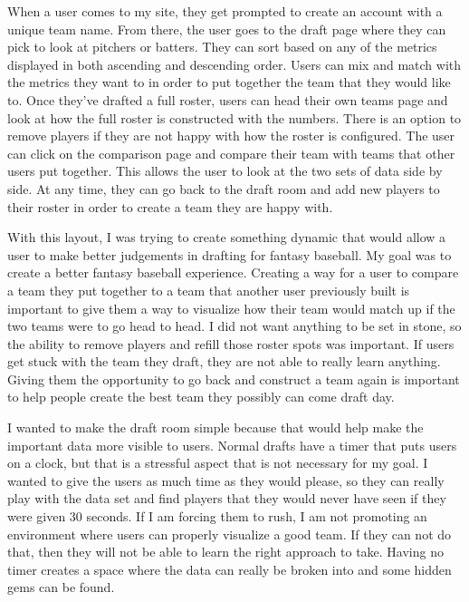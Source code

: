 \documentclass[10pt,twocolumn]{article}
\begin{document}
	When a user comes to my site, they get prompted to create an account with a unique team name. From there, the user goes to the draft page where they can pick to look at pitchers or batters. They can sort based on any of the metrics displayed in both ascending and descending order. Users can mix and match with the metrics they want to in order to put together the team that they would like to. Once they've drafted a full roster, users can head their own teams page and look at how the full roster is constructed with the numbers. There is an option to remove players if they are not happy with how the roster is configured. The user can click on the comparison page and compare their team with teams that other users put together. This allows the user to look at the two sets of data side by side. At any time, they can go back to the draft room and add new players to their roster in order to create a team they are happy with.
	
	With this layout, I was trying to create something dynamic that would allow a user to make better judgements in drafting for fantasy baseball. My goal was to create a better fantasy baseball experience. Creating a way for a user to compare a team they put together to a team that another user previously built is important to give them a way to visualize how their team would match up if the two teams were to go head to head. I did not want anything to be set in stone, so the ability to remove players and refill those roster spots was important. If users get stuck with the team they draft, they are not able to really learn anything. Giving them the opportunity to go back and construct a team again is important to help people create the best team they possibly can come draft day. 
	
	I wanted to make the draft room simple because that would help make the important data more visible to users. Normal drafts have a timer that puts users on a clock, but that is a stressful aspect that is not necessary for my goal. I wanted to give the users as much time as they would please, so they can really play with the data set and find players that they would never have seen if they were given 30 seconds. If I am forcing them to rush, I am not promoting an environment where users can properly visualize a good team. If they can not do that, then they will not be able to learn the right approach to take. Having no timer creates a space where the data can really be broken into and some hidden gems can be found.
	
\end{document}
